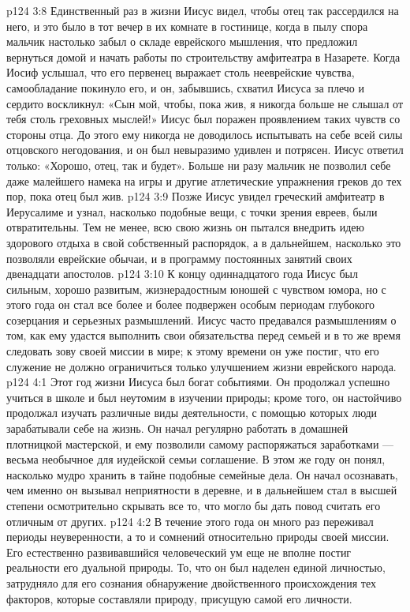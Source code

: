 \vs p124 3:8 Единственный раз в жизни Иисус видел, чтобы отец так рассердился на него, и это было в тот вечер в их комнате в гостинице, когда в пылу спора мальчик настолько забыл о складе еврейского мышления, что предложил вернуться домой и начать работы по строительству амфитеатра в Назарете. Когда Иосиф услышал, что его первенец выражает столь нееврейские чувства, самообладание покинуло его, и он, забывшись, схватил Иисуса за плечо и сердито воскликнул: «Сын мой, чтобы, пока жив, я никогда больше не слышал от тебя столь греховных мыслей!» Иисус был поражен проявлением таких чувств со стороны отца. До этого ему никогда не доводилось испытывать на себе всей силы отцовского негодования, и он был невыразимо удивлен и потрясен. Иисус ответил только: «Хорошо, отец, так и будет». Больше ни разу мальчик не позволил себе даже малейшего намека на игры и другие атлетические упражнения греков до тех пор, пока отец был жив.
\vs p124 3:9 Позже Иисус увидел греческий амфитеатр в Иерусалиме и узнал, насколько подобные вещи, с точки зрения евреев, были отвратительны. Тем не менее, всю свою жизнь он пытался внедрить идею здорового отдыха в свой собственный распорядок, а в дальнейшем, насколько это позволяли еврейские обычаи, и в программу постоянных занятий своих двенадцати апостолов.
\vs p124 3:10 К концу одиннадцатого года Иисус был сильным, хорошо развитым, жизнерадостным юношей с чувством юмора, но с этого года он стал все более и более подвержен особым периодам глубокого созерцания и серьезных размышлений. Иисус часто предавался размышлениям о том, как ему удастся выполнить свои обязательства перед семьей и в то же время следовать зову своей миссии в мире; к этому времени он уже постиг, что его служение не должно ограничиться только улучшением жизни еврейского народа.
\vs p124 4:1 Этот год жизни Иисуса был богат событиями. Он продолжал успешно учиться в школе и был неутомим в изучении природы; кроме того, он настойчиво продолжал изучать различные виды деятельности, с помощью которых люди зарабатывали себе на жизнь. Он начал регулярно работать в домашней плотницкой мастерской, и ему позволили самому распоряжаться заработками --- весьма необычное для иудейской семьи соглашение. В этом же году он понял, насколько мудро хранить в тайне подобные семейные дела. Он начал осознавать, чем именно он вызывал неприятности в деревне, и в дальнейшем стал в высшей степени осмотрительно скрывать все то, что могло бы дать повод считать его отличным от других.
\vs p124 4:2 В течение этого года он много раз переживал периоды неуверенности, а то и сомнений относительно природы своей миссии. Его естественно развивавшийся человеческий ум еще не вполне постиг реальности его дуальной природы. То, что он был наделен единой личностью, затрудняло для его сознания обнаружение двойственного происхождения тех факторов, которые составляли природу, присущую самой его личности.

